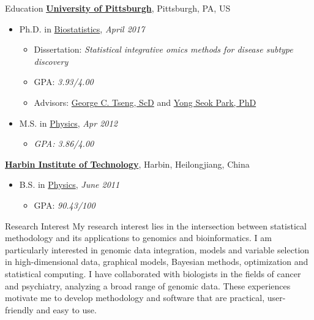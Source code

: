 \documentclass{resume} %
\begin{document}

\begin{rSection}{Education}
\href{http://www.pitt.edu}{\textbf{University of Pittsburgh}}, \hfill{Pittsburgh, PA, US}
\begin{itemize}[noitemsep,topsep=0pt]
\item Ph.D. in
        \href{http://www.publichealth.pitt.edu/biostatistics}
             {Biostatistics},
              \hfill{\em April 2017}
	\begin{itemize}
        \item Dissertation:  \emph{Statistical integrative omics methods for disease subtype discovery}
        \item GPA: \emph{3.93/4.00}
        \item Advisors:
              \href{http://www.pitt.edu/~ctseng/}
                   {George C. Tseng, ScD} and
              \href{http://www.publichealth.pitt.edu/home/directory/yong-seok-park/}
                   {Yong Seok Park, PhD}
	\end{itemize}
	\item M.S. in
        \href{http://www.physicsandastronomy.pitt.edu}
             {Physics}, \hfill {\em Apr 2012}              
	\begin{itemize}
	\item {\emph{GPA: 3.86/4.00}}
	\end{itemize}
\end{itemize}

\href{http://www.hit.edu.cn} {\textbf{Harbin Institute of Technology}},
\hfill{Harbin, Heilongjiang, China}
\begin{itemize}[noitemsep,topsep=0pt]
\item B.S. in
        \href{http://physics.hit.edu.cn/}
             {Physics}, \hfill {\em June 2011} 
        \begin{itemize}
        \item GPA: \emph{90.43/100}
        \end{itemize}

\end{itemize}
\end{rSection}
\begin{rSection}{Research Interest}
My research interest lies in the intersection between statistical methodology and its applications to genomics and bioinformatics.	
I am particularly interested in genomic data integration, models and variable selection in high-dimensional data, graphical models, Bayesian methods, optimization and statistical computing. 
I have collaborated with biologists in the fields of cancer and psychiatry, analyzing a broad range of genomic data. 
These experiences motivate me to develop methodology and software that are practical, user-friendly and easy to use.
\end{rSection}
\end{document}
